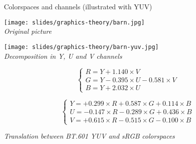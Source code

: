 \begin{frame}{Colorspaces and channels (illustrated with YUV)}
  \begin{minipage}[t]{0.25\textwidth}
    \centering
    \texttt{[image: slides/graphics-theory/barn.jpg]}\\
    \textit{\small Original picture}
  \end{minipage}
  \hfill
  \begin{minipage}[t]{0.7\textwidth}
    \centering
    \texttt{[image: slides/graphics-theory/barn-yuv.jpg]}\\
    \textit{\small Decomposition in Y, U and V channels}
  \end{minipage}

  \vspace{1em}

  \begin{minipage}[t]{0.4\textwidth}
    \small
    \begin{equation*}
    \begin{cases}
    R = Y + 1.140 \times V\\
    G = Y - 0.395 \times U - 0.581 \times V\\
    B = Y + 2.032 \times U
    \end{cases}
    \end{equation*}
  \end{minipage}
  \hfill
  \begin{minipage}[t]{0.55\textwidth}
    \small
    \begin{equation*}
    \begin{cases}
    Y = + 0.299 \times R + 0.587 \times G + 0.114 \times B\\
    U = - 0.147 \times R - 0.289 \times G + 0.436 \times B\\
    V = + 0.615 \times R - 0.515 \times G - 0.100 \times B
    \end{cases}
    \end{equation*}
  \end{minipage}

  \begin{center}
     \textit{\small Translation between BT.601 YUV and sRGB colorspaces}
  \end{center}
\end{frame}

